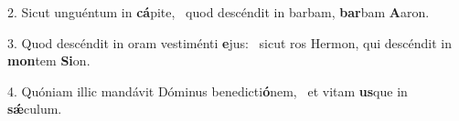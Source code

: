 2. Sicut unguéntum in \textbf{cá}pite, \ast\  quod descéndit in barbam, \textbf{bar}bam \textbf{A}aron.\

3. Quod descéndit in oram vestiménti \textbf{e}jus: \ast\  sicut ros Hermon, qui descéndit in \textbf{mon}tem \textbf{Si}on.\

4. Quóniam illic mandávit Dóminus benedicti\textbf{ó}nem, \ast\  et vitam \textbf{us}que in \textbf{sǽ}culum.\

